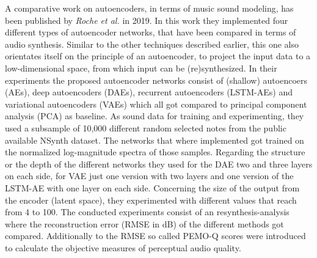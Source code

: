 A comparative work on autoencoders, in terms of music sound modeling, has been published by \textit{Roche et al.} in 2019. \cite{roche2019autoencoders} In this work they implemented four different types of autoencoder networks, that have been compared in terms of audio synthesis. Similar to the other techniques described earlier, this one also orientates itself on the principle of an autoencoder, to project the input data to a low-dimensional space, from which input can be (re)synthesized. In their experiments the proposed autoencoder networks consist of (shallow) autoencoers (AEs), deep autoencoders (DAEs), recurrent autoencoders (LSTM-AEs) and variational autoencoders (VAEs) which all got compared to principal component analysis (PCA) as baseline. As sound data for training and experimenting, they used a subsample of 10,000 different random selected notes from the public available NSynth dataset. The networks that where implemented got trained on the normalized log-magnitude spectra of those samples. Regarding the structure or the depth of the different networks they used for the DAE two and three layers on each side, for VAE just one version with two layers and one version of the LSTM-AE with one layer on each side. Concerning the size of the output from the encoder (latent space), they experimented with different values that reach from 4 to 100. The conducted experiments consist of an resynthesis-analysis where the reconstruction error (RMSE in dB) of the different methods got compared. Additionally to the RMSE so called PEMO-Q scores were introduced to calculate the objective measures of perceptual audio quality.\\
